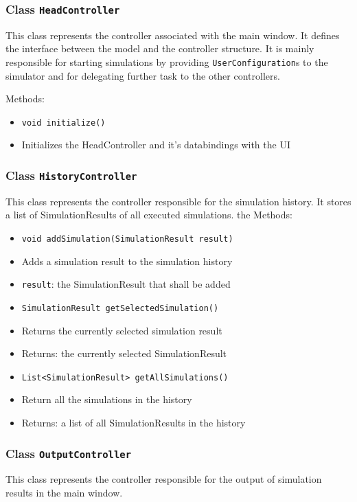 \documentclass[parskip=full,11pt]{scrartcl}
\begin{document}
\subsubsection{Class \texttt{HeadController}}
This class represents the controller associated with the main window. It defines the interface between the model and the controller structure. It is mainly responsible for starting simulations by providing \texttt{UserConfiguration}s to the simulator and for delegating further task to the other controllers.

Methods:
\begin{itemize}\itemsep -10pt
\item \texttt{void initialize()}
\item[] Initializes the HeadController and it's databindings with the UI
\end{itemize}

\subsubsection{Class \texttt{HistoryController}}
This class represents the controller responsible for the simulation history. It stores a list of SimulationResults of all executed simulations.
the
Methods:
\begin{itemize}\itemsep -10pt
\item \texttt{void addSimulation(SimulationResult result)}
\item[] Adds a simulation result to the simulation history
\item[] \texttt{result}: the SimulationResult that shall be added

\item \texttt{SimulationResult getSelectedSimulation()}
\item[] Returns the currently selected simulation result
\item[] Returns: the currently selected SimulationResult

\item \texttt{List<SimulationResult> getAllSimulations()}
\item[] Return all the simulations in the history
\item[] Returns: a list of all SimulationResults in the history
\end{itemize}

\subsubsection{Class \texttt{OutputController}}
This class represents the controller responsible for the output of simulation results in the main window.
\end{document}

